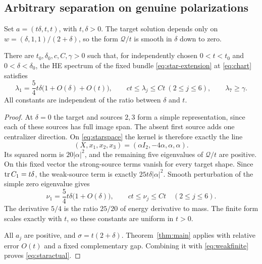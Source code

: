 \subsection{Arbitrary separation on genuine polarizations}
Set $a=(t\delta,t,t)$, with $t,\delta>0$. The target solution
depends only on $w=(\delta,1,1)/(2+\delta)$, so the form
$\mathcal Q/t$ is smooth in $\delta$ down to zero.

\begin{theorem}\label{thm:star-scales}
There are $t_0,\delta_0,c,C,\gamma>0$ such that, for independently
chosen $0<t<t_0$ and $0<\delta<\delta_0$, the HE spectrum of the
fixed bundle \eqref{eq:star-extension} at \eqref{eq:chart} satisfies
\begin{equation}\label{eq:staractual}
\lambda_1=\frac54t\delta\bigl(1+O(\delta)+O(t)\bigr),\qquad
ct\le\lambda_j\le Ct\ (2\le j\le6),\qquad
\lambda_7\ge\gamma.
\end{equation}
All constants are independent of the ratio between $\delta$ and $t$.
\end{theorem}

\begin{proof}
At $\delta=0$ the target and sources $2,3$ form a simple
representation, since each of these sources has full image span.
The absent first source adds one centralizer direction. On
\eqref{eq:starspace} the kernel is therefore exactly the line
\begin{equation}\label{eq:weakkernel}
(X,x_1,x_2,x_3)=(\alpha I_2,-4\alpha,\alpha,\alpha).
\end{equation}
Its squared norm is $20|\alpha|^2$, and the remaining five
eigenvalues of $\mathcal Q/t$ are positive. On this fixed vector
the strong-source terms vanish for every target shape. Since
$\operatorname{tr} C_1=t\delta$, the weak-source term is exactly
$25t\delta|\alpha|^2$. Smooth perturbation of the simple zero
eigenvalue gives
\begin{equation}\label{eq:weakfinite}
\nu_1=\frac54t\delta\bigl(1+O(\delta)\bigr),\qquad
ct\le\nu_j\le Ct\quad(2\le j\le6).
\end{equation}
The derivative $5/4$ is the ratio $25/20$ of energy derivative
to mass. The finite form scales exactly with $t$, so these
constants are uniform in $t>0$.

All $a_j$ are positive, and
$\sigma=t(2+\delta)$. Theorem~\ref{thm:main} applies with
relative error $O(t)$ and a fixed complementary gap. Combining
it with \eqref{eq:weakfinite} proves \eqref{eq:staractual}.
\end{proof}

